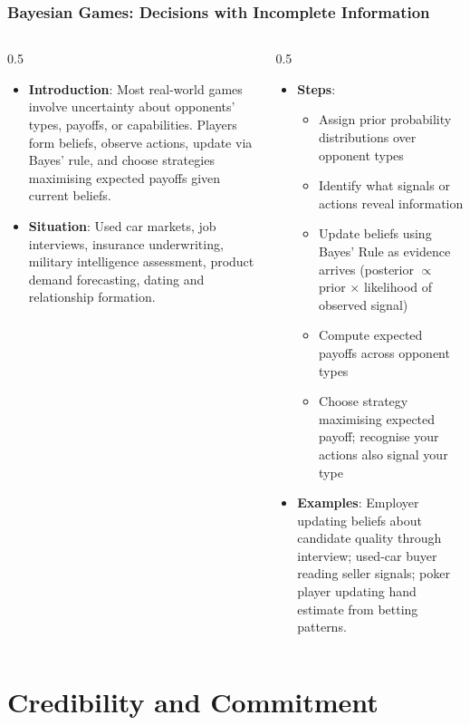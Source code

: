 \begin{frame}[fragile]\frametitle{Bayesian Games: Decisions with Incomplete Information}
\begin{columns}
    \begin{column}[T]{0.5\linewidth}
      \begin{itemize}
        \item \textbf{Introduction}: Most real-world games involve uncertainty about opponents' types, payoffs, or capabilities. Players form beliefs, observe actions, update via Bayes' rule, and choose strategies maximising expected payoffs given current beliefs.
        \item \textbf{Situation}: Used car markets, job interviews, insurance underwriting, military intelligence assessment, product demand forecasting, dating and relationship formation.
      \end{itemize}
    \end{column}
    \begin{column}[T]{0.5\linewidth}
      \begin{itemize}
        \item \textbf{Steps}:
        \begin{itemize}
          \item Assign prior probability distributions over opponent types
          \item Identify what signals or actions reveal information
          \item Update beliefs using Bayes' Rule as evidence arrives (posterior $\propto$ prior $\times$ likelihood of observed signal)
          \item Compute expected payoffs across opponent types
          \item Choose strategy maximising expected payoff; recognise your actions also signal your type
        \end{itemize}\item \textbf{Examples}: Employer updating beliefs about candidate quality through interview; used-car buyer reading seller signals; poker player updating hand estimate from betting patterns.
      \end{itemize}
    \end{column}
  \end{columns}
\end{frame}

\section{Credibility and Commitment}

